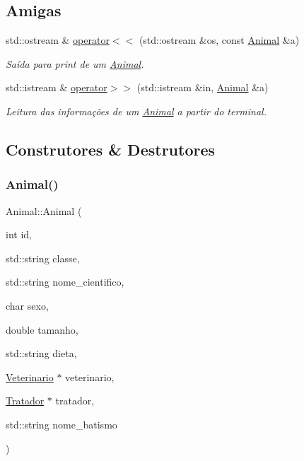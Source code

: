 \subsection*{Amigas}
\begin{DoxyCompactItemize}
\item 
std\+::ostream \& \hyperlink{classAnimal_a73976e856798b5e0d87bce71edb0f009}{operator$<$$<$} (std\+::ostream \&os, const \hyperlink{classAnimal}{Animal} \&a)
\begin{DoxyCompactList}\small\item\em Saída para print de um \hyperlink{classAnimal}{Animal}. \end{DoxyCompactList}\item 
std\+::istream \& \hyperlink{classAnimal_a45423c605b4cd1ff547d3927f025ad49}{operator$>$$>$} (std\+::istream \&in, \hyperlink{classAnimal}{Animal} \&a)
\begin{DoxyCompactList}\small\item\em Leitura das informações de um \hyperlink{classAnimal}{Animal} a partir do terminal. \end{DoxyCompactList}\end{DoxyCompactItemize}


\subsection{Construtores \& Destrutores}
\mbox{\label{classAnimal_ab045099aad905de0d8c7fbbab296cad6}} 
\subsubsection{\texorpdfstring{Animal()}{Animal()}\hspace{0.1cm}{\footnotesize\ttfamily [1/2]}}
{\footnotesize\ttfamily Animal\+::\+Animal (\begin{DoxyParamCaption}\item[{int}]{id,  }\item[{std\+::string}]{classe,  }\item[{std\+::string}]{nome\+\_\+cientifico,  }\item[{char}]{sexo,  }\item[{double}]{tamanho,  }\item[{std\+::string}]{dieta,  }\item[{\hyperlink{classVeterinario}{Veterinario} $\ast$}]{veterinario,  }\item[{\hyperlink{classTratador}{Tratador} $\ast$}]{tratador,  }\item[{std\+::string}]{nome\+\_\+batismo }\end{DoxyParamCaption})}



